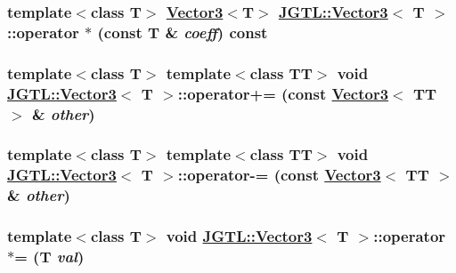 \hypertarget{class_j_g_t_l_1_1_vector3_0ea35cf6fa072615683d4ad70ecad938}{
\subsubsection[operator $\ast$]{\setlength{\rightskip}{0pt plus 5cm}template$<$class T$>$ \hyperlink{class_j_g_t_l_1_1_vector3}{Vector3}$<$T$>$ \hyperlink{class_j_g_t_l_1_1_vector3}{JGTL::Vector3}$<$ T $>$::operator $\ast$ (const T \& {\em coeff}) const}}
\label{class_j_g_t_l_1_1_vector3_0ea35cf6fa072615683d4ad70ecad938}


\hypertarget{class_j_g_t_l_1_1_vector3_3673291ef3d210d322d9ade1ba95d187}{
\subsubsection[operator+=]{\setlength{\rightskip}{0pt plus 5cm}template$<$class T$>$ template$<$class TT$>$ void \hyperlink{class_j_g_t_l_1_1_vector3}{JGTL::Vector3}$<$ T $>$::operator+= (const \hyperlink{class_j_g_t_l_1_1_vector3}{Vector3}$<$ TT $>$ \& {\em other})}}
\label{class_j_g_t_l_1_1_vector3_3673291ef3d210d322d9ade1ba95d187}


\hypertarget{class_j_g_t_l_1_1_vector3_a1a1507a82937de0c6978326c48f65aa}{
\subsubsection[operator-=]{\setlength{\rightskip}{0pt plus 5cm}template$<$class T$>$ template$<$class TT$>$ void \hyperlink{class_j_g_t_l_1_1_vector3}{JGTL::Vector3}$<$ T $>$::operator-= (const \hyperlink{class_j_g_t_l_1_1_vector3}{Vector3}$<$ TT $>$ \& {\em other})}}
\label{class_j_g_t_l_1_1_vector3_a1a1507a82937de0c6978326c48f65aa}


\hypertarget{class_j_g_t_l_1_1_vector3_a8e375b5e3a512bde0dfe8337cf42cee}{
\subsubsection[operator $\ast$=]{\setlength{\rightskip}{0pt plus 5cm}template$<$class T$>$ void \hyperlink{class_j_g_t_l_1_1_vector3}{JGTL::Vector3}$<$ T $>$::operator $\ast$= (T {\em val})}}
\label{class_j_g_t_l_1_1_vector3_a8e375b5e3a512bde0dfe8337cf42cee}



